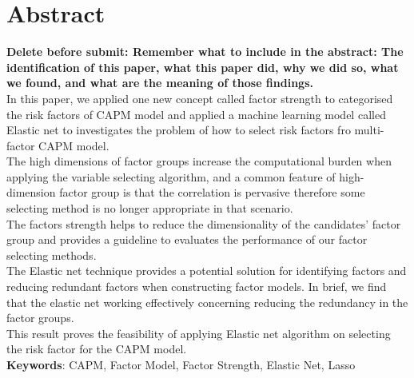 		
		
		
		
		
		


\chapter*{Abstract}
	\textbf{Delete before submit: Remember what to include in the abstract: The identification of this paper, what this paper did, why we did so, what we found, and what are the meaning of those findings.}\\
In this paper, we applied one new concept called factor strength to categorised the risk factors of CAPM model and applied a machine learning model called Elastic net to investigates the problem of how to select risk factors fro multi-factor CAPM model.\\
The high dimensions of factor groups increase the computational burden when applying the variable selecting algorithm, and a common feature of high-dimension factor group is that the correlation is pervasive therefore some selecting method is no longer appropriate in that scenario.\\
The factors strength helps to reduce the dimensionality of the candidates' factor group and provides a guideline to evaluates the performance of our factor selecting methods.\\
The Elastic net technique provides a potential solution for identifying factors and reducing redundant factors when constructing factor models.
In brief, we find that the elastic net working effectively concerning reducing the redundancy in the factor groups.\\
This result proves the feasibility of applying Elastic net algorithm on selecting the risk factor for the CAPM model.  \\
 \textbf{Keywords}: CAPM, Factor Model, Factor Strength, Elastic Net, Lasso


